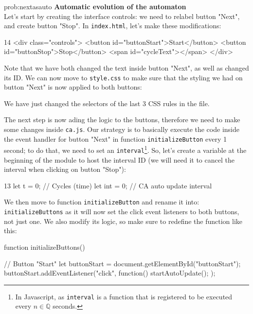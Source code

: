 \begin{sol}{prob:nextasauto}
\textbf{Automatic evolution of the automaton}\\
Let's start by creating the interface controls: we need to relabel button "Next", and create button "Stop".
In \texttt{index.html}, let's make these modifications:
\begin{codehtmlh1}{1}{4}
<div class="controls">
  <button id="buttonStart">Start</button>
  <button id="buttonStop">Stop</button>
  <span id="cycleText"></span>
</div>
\end{codehtmlh1}
Note that we have both changed the text inside button "Next", as well as changed its ID.
We can now move to \texttt{style.css} to make sure that the styling we had on button "Next" is now
applied to both buttons:
We have just changed the selectors of the last 3 CSS rules in the file.

The next step is now ading the logic to the buttons, therefore we need to make some changes inside
\texttt{ca.js}. Our strategy is to basically execute the code inside the event handler for button "Next" in
function \texttt{initializeButton} every 1 second; to do that, we need to set an
\texttt{interval}\footnote{In Javascript, as \texttt{interval} is a function that is registered to be
executed every $n \in \mathbb{Q}$ seconds.}. So, let's create a variable at the beginning of the module to
host the interval ID (we will need it to cancel the interval when clicking on button "Stop"):
\begin{codeh1}{1}{3}
let t = 0; // Cycles (time)
let int = 0; // CA auto update interval
\end{codeh1}
We then move to function \texttt{initializeButton} and rename it into: \texttt{initializeButtons} as it will now
set the click event listeners to both buttons, not just one. We also modify its logic, so make sure
to redefine the function like this:
\begin{code}
function initializeButtons() {
  // Button "Start"
  let buttonStart = document.getElementById("buttonStart");
  buttonStart.addEventListener("click", function(){
    startAutoUpdate();
  });

}
\end{code}
\end{sol}
